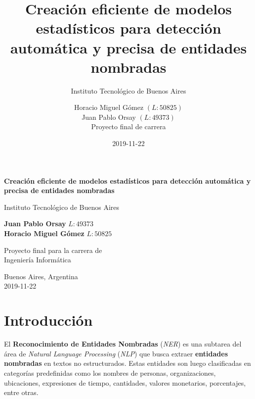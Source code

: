 \documentclass[12pt,a4paper,]{scrartcl}
\title{Creación eficiente de modelos estadísticos para detección automática y precisa de entidades nombradas}
\subtitle{Instituto Tecnológico de Buenos Aires}
\author{Horacio Miguel Gómez \((L:50825)\) \\ Juan Pablo Orsay \((L:49373)\) \\ Proyecto final de carrera}
\date{2019-11-22}
\let\oldmaketitle\maketitle
\begin{document}
\maketitle

\begin{titlepage}
    \begin{center}
        \vspace*{1cm}

        \Huge
        \textbf{Creación eficiente de modelos estadísticos para detección automática y precisa de entidades nombradas}

        \vspace{0.5cm}
        \LARGE
        Instituto Tecnológico de Buenos Aires

        \vspace{1.5cm}

        \textbf{Juan Pablo Orsay} $L : 49373$\\
        \textbf{Horacio Miguel Gómez} $L : 50825$

        \vfill

        Proyecto final para la carrera de\\
        Ingeniería Informática

        \vspace{0.8cm}


        \Large
        Buenos Aires, Argentina\\
        2019-11-22

    \end{center}
\end{titlepage}

\let\maketitle\oldmaketitle

{
\setcounter{tocdepth}{2}
\tableofcontents
}
\newpage

\hypertarget{intro}{%
\section{Introducción}\label{intro}}

El \textbf{Reconocimiento de Entidades Nombradas} (\emph{NER}) es una subtarea del área de \emph{Natural Language Processing} (\emph{NLP}) que busca extraer \textbf{entidades nombradas} en textos no estructurados. Estas entidades son luego clasificadas en categorías predefinidas como los nombres de personas, organizaciones, ubicaciones, expresiones de tiempo, cantidades, valores monetarios, porcentajes, entre otras.
\end{document}
